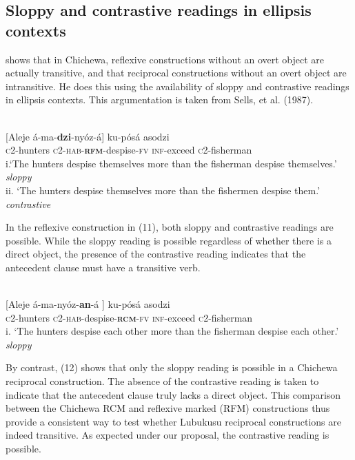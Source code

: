 \documentclass[output=paper]{langsci/langscibook}
\begin{document}
\subsection{Sloppy and contrastive readings in ellipsis contexts}

  \citet[106]{Mchombo2004} shows that in Chichewa, reflexive constructions without an overt object are actually transitive, and that reciprocal constructions without an overt object are intransitive. He does this using the availability of sloppy and contrastive readings in ellipsis contexts. This argumentation is taken from Sells, et al. (1987).



\ea\label{ex:}
\\
{}[Aleje    á-ma-\textbf{{dzi}}{-nyóz-á}] ku-pósá   asodzi \\
  \textsc{c}2-hunters   \textsc{c2-hab-}\textbf{\textsc{rfm}}-despise-\textsc{fv}   \textsc{inf}-exceed   \textsc{c}2-fisherman\\
\glt i.‘The hunters despise themselves more than the fisherman despise themselves.’ \textit{sloppy} \\
\glt ii. ‘The hunters despise themselves more than the fishermen despise them.’    \textit{contrastive}
\z


In the reflexive construction in (11), both sloppy and contrastive readings are possible. While the sloppy reading is possible regardless of whether there is a direct object, the presence of the contrastive reading indicates that the antecedent clause must have a transitive verb. 


\ea\label{ex:}
  \\
\gll {}[Aleje     á-ma-nyóz-\textbf{an}-á   ]    ku-pósá   asodzi \\
\textsc{c}2-hunters   \textsc{c2-hab}-despise-\textbf{\textsc{rcm}}\textsc{-fv}     \textsc{inf}-exceed   \textsc{c}2-fisherman \\
\glt
i. ‘The hunters despise each other more than the fisherman despise each other.'  \textit{sloppy}  
\z


By contrast, (12) shows that only the sloppy reading is possible in a Chichewa reciprocal construction. The absence of the contrastive reading is taken to indicate that the antecedent clause truly lacks a direct object. This comparison between the Chichewa RCM and reflexive marked (RFM) constructions thus provide a consistent way to test whether Lubukusu reciprocal constructions are indeed transitive. As expected under our proposal, the contrastive reading is possible.
\end{document}
